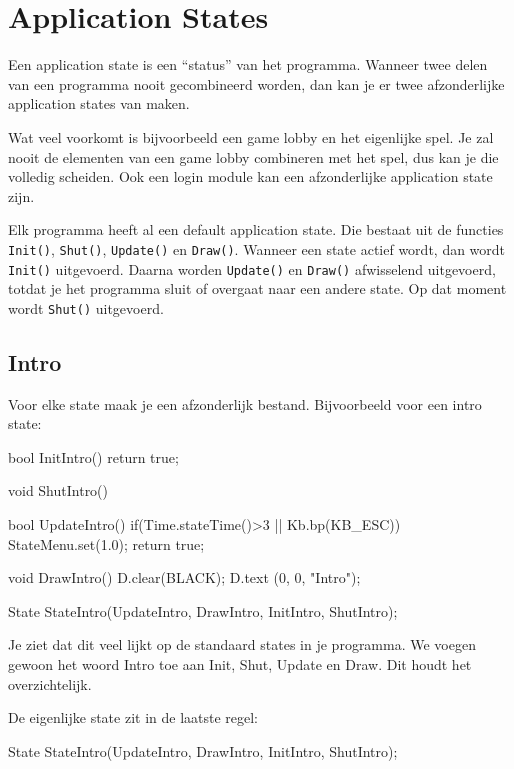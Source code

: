 \chapter{Application States}
\label{chapter:application_states}

Een application state is een ``status'' van het programma. Wanneer twee delen van een programma nooit gecombineerd worden, dan kan je er twee afzonderlijke application states van maken. 

Wat veel voorkomt is bijvoorbeeld een game lobby en het eigenlijke spel. Je zal nooit de elementen van een game lobby combineren met het spel, dus kan je die volledig scheiden. Ook een login module kan een afzonderlijke application state zijn.

Elk programma heeft al een default application state. Die bestaat uit de functies \texttt{Init()}, \texttt{Shut()}, \texttt{Update()} en \texttt{Draw()}. Wanneer een state actief wordt, dan wordt \texttt{Init()} uitgevoerd. Daarna worden \texttt{Update()} en \texttt{Draw()} afwisselend uitgevoerd, totdat je het programma sluit of overgaat naar een andere state. Op dat moment wordt \texttt{Shut()} uitgevoerd.

\section{Intro}
Voor elke state maak je een afzonderlijk bestand. Bijvoorbeeld voor een intro state:

\begin{code}
bool InitIntro() {return true;}

void ShutIntro() {}

bool UpdateIntro()
{
   if(Time.stateTime()>3 || Kb.bp(KB_ESC)) {
      StateMenu.set(1.0);                    
   }
   return true;
}

void DrawIntro()
{
   D.clear(BLACK);
   D.text (0, 0, "Intro");
}

State StateIntro(UpdateIntro, DrawIntro, InitIntro, ShutIntro);
\end{code}

Je ziet dat dit veel lijkt op de standaard states in je programma. We voegen gewoon het woord Intro toe aan Init, Shut, Update en Draw. Dit houdt het overzichtelijk.

De eigenlijke state zit in de laatste regel:

\begin{code}
State StateIntro(UpdateIntro, DrawIntro, InitIntro, ShutIntro);
\end{code}

